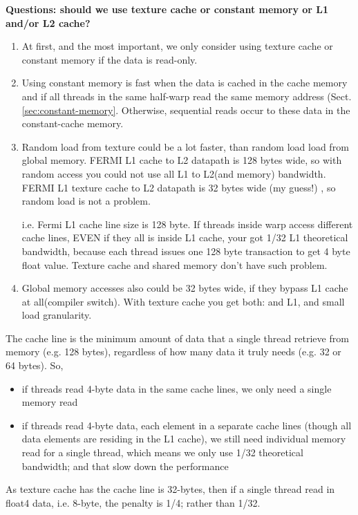 {\bf Questions: should we use texture cache or constant memory or L1
  and/or L2 cache?}

\begin{enumerate}
\item At first, and the most important, we only consider using texture
  cache or constant memory if the data is read-only.

\item Using constant memory is fast when the data is cached in the cache memory
and if all threads in the same half-warp read the same memory address
(Sect.\ref{sec:constant-memory}. Otherwise, sequential reads occur to these data
in the constant-cache memory.

\item Random load from texture could be a lot faster, than random load load from
  global memory. FERMI L1 cache to L2 datapath is 128 bytes wide, so
  with random access you could not use all L1 to L2(and memory)
  bandwidth. FERMI L1 texture cache to L2 datapath is 32 bytes wide
  (my guess!) , so random load is not a problem.

  i.e. Fermi L1 cache line size is 128 byte. If threads inside warp
  access different cache lines, EVEN if they all is inside L1 cache,
  your got 1/32 L1 theoretical bandwidth, because each thread issues
  one 128 byte transaction to get 4 byte float value.  Texture cache
  and shared memory don't have such problem.

\item Global memory accesses also could be 32 bytes wide, if they
  bypass L1 cache at all(compiler switch). With texture cache you get
  both: and L1, and small load granularity.
\end{enumerate}

\begin{framed}
  The cache line is the minimum amount of data that a single thread
  retrieve from memory (e.g. 128 bytes), regardless of how many data
  it truly needs (e.g. 32 or 64 bytes). So, 
  \begin{itemize}
  \item if threads read 4-byte data in the same cache lines, we only
    need a single memory read
  \item if threads read 4-byte data, each element in a separate cache
    lines (though all data elements are residing in the L1 cache), we
    still need individual memory read for a single thread, which means
    we only use 1/32 theoretical bandwidth; and that slow down the
    performance 
  \end{itemize}

  As texture cache has the cache line is 32-bytes, then if a single
  thread read in float4 data, i.e. 8-byte, the penalty is 1/4; rather
  than 1/32. 
\end{framed}

